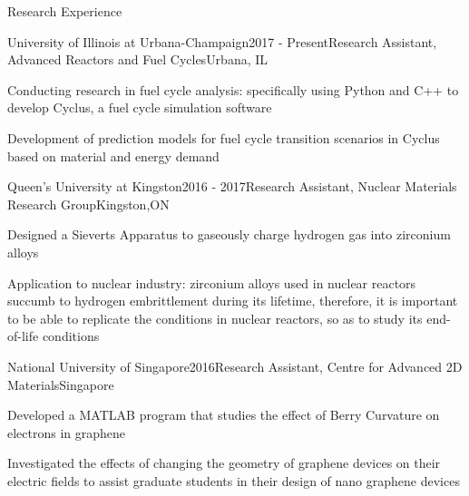 \documentclass{resume2} %
\begin{document}
\begin{rSection}{Research Experience}

\begin{rSubsection}{University of Illinois at Urbana-Champaign}{2017 - Present}{Research Assistant, Advanced Reactors and Fuel Cycles}{Urbana, IL}
\item Conducting research in fuel cycle analysis: specifically using Python and C++ to develop Cyclus, a fuel cycle simulation software
\item Development of prediction models for fuel cycle transition scenarios in Cyclus based on material and energy demand 
\end{rSubsection}

\begin{rSubsection}{Queen's University at Kingston}{2016 - 2017}{Research Assistant, Nuclear Materials Research Group}{Kingston,ON}
\item Designed a Sieverts Apparatus to gaseously charge hydrogen gas into zirconium alloys
\item Application to nuclear industry: zirconium alloys used in nuclear reactors succumb to hydrogen embrittlement during its lifetime, therefore, it is important to be able to replicate the conditions in nuclear reactors, so as to study its end-of-life conditions
\end{rSubsection}

\begin{rSubsection}{National University of Singapore}{2016}{Research Assistant, Centre for Advanced 2D Materials}{Singapore}
	\item Developed a MATLAB program that studies the effect of Berry Curvature on electrons in graphene
	\item Investigated the effects of changing the geometry of graphene devices on their electric fields to assist graduate students in their design of nano graphene devices
\end{rSubsection}
\iffalse
	\begin{rSubsection}{Nanyang Technological University}{2015}{Research Assistant, Polymeric Biomaterials Group}{Singapore}
	\item Involved in Biodegradable Heart Stent project. Prepared polymer specimens with varying nanoparticle concentrations and tested them to compare their mechanical strength
	\end{rSubsection}
\fi

\end{rSection}
\end{document}
